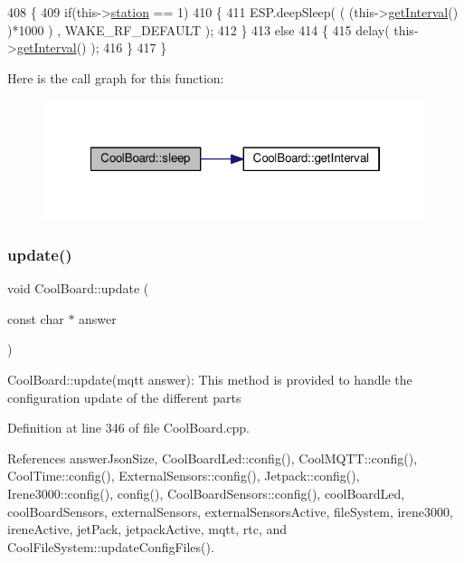 \begin{DoxyCode}
408 \{
409     \textcolor{keywordflow}{if}(this->\hyperlink{classCoolBoard_a164c550df8424e32fe90bce460c7becf}{station} == 1)
410     \{
411         ESP.deepSleep( ( (this->\hyperlink{classCoolBoard_a31cf73a70425114cd7ee49c6e5244199}{getInterval}() )*1000 ) , WAKE\_RF\_DEFAULT );  
412     \}
413     \textcolor{keywordflow}{else}
414     \{
415         delay( this->\hyperlink{classCoolBoard_a31cf73a70425114cd7ee49c6e5244199}{getInterval}() );    
416     \}
417 \}
\end{DoxyCode}
Here is the call graph for this function\+:
\nopagebreak
\begin{figure}[H]
\begin{center}
\leavevmode
\includegraphics[width=322pt]{classCoolBoard_a5caa34e713c0b138e34390ddc4208fd3_cgraph}
\end{center}
\end{figure}
\mbox{\label{classCoolBoard_a8612756d3f73198cdde857a66f0fe690}} 
\subsubsection{\texorpdfstring{update()}{update()}}
{\footnotesize\ttfamily void Cool\+Board\+::update (\begin{DoxyParamCaption}\item[{const char $\ast$}]{answer }\end{DoxyParamCaption})}

Cool\+Board\+::update(mqtt answer)\+: This method is provided to handle the configuration update of the different parts 

Definition at line 346 of file Cool\+Board.\+cpp.



References answer\+Json\+Size, Cool\+Board\+Led\+::config(), Cool\+M\+Q\+T\+T\+::config(), Cool\+Time\+::config(), External\+Sensors\+::config(), Jetpack\+::config(), Irene3000\+::config(), config(), Cool\+Board\+Sensors\+::config(), cool\+Board\+Led, cool\+Board\+Sensors, external\+Sensors, external\+Sensors\+Active, file\+System, irene3000, irene\+Active, jet\+Pack, jetpack\+Active, mqtt, rtc, and Cool\+File\+System\+::update\+Config\+Files().



